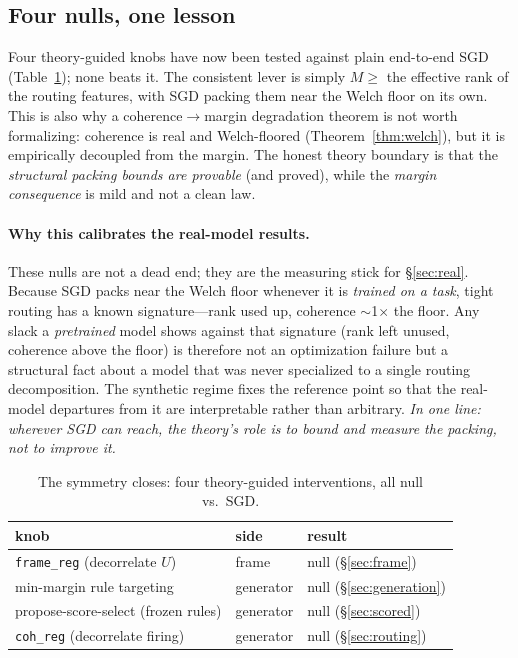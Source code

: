 \documentclass[sigconf,nonacm]{acmart}
\theoremstyle{definition}
\begin{document}
\subsection{Four nulls, one lesson}
\label{sec:nulls}
Four theory-guided knobs have now been tested against plain end-to-end SGD
(Table~\ref{tab:nulls}); none beats it. The consistent lever is simply
$M\ge$ the effective rank of the routing features, with SGD packing them near the
Welch floor on its own. This is also why a coherence$\to$margin degradation theorem
is not worth formalizing: coherence is real and Welch-floored (Theorem~\ref{thm:welch}),
but it is empirically decoupled from the margin. The honest theory boundary is that
the \emph{structural packing bounds are provable} (and proved), while the
\emph{margin consequence} is mild and not a clean law.

\paragraph{Why this calibrates the real-model results.}
These nulls are not a dead end; they are the measuring stick for
\S\ref{sec:real}. Because SGD packs near the Welch floor whenever it is \emph{trained
on a task}, tight routing has a known signature---rank used up, coherence
$\sim$1$\times$ the floor. Any slack a \emph{pretrained} model shows against that
signature (rank left unused, coherence above the floor) is therefore not an
optimization failure but a structural fact about a model that was never specialized
to a single routing decomposition. The synthetic regime fixes the reference point so
that the real-model departures from it are interpretable rather than arbitrary.
\emph{In one line: wherever SGD can reach, the theory's role is to bound and measure
the packing, not to improve it.}

\begin{table}[t]
\caption{The symmetry closes: four theory-guided interventions, all null vs.\ SGD.}
\label{tab:nulls}
\small
\begin{tabular}{lll}
\toprule
knob & side & result \\
\midrule
\texttt{frame\_reg} (decorrelate $U$)         & frame     & null (\S\ref{sec:frame}) \\
min-margin rule targeting                      & generator & null (\S\ref{sec:generation}) \\
propose-score-select (frozen rules)            & generator & null (\S\ref{sec:scored}) \\
\texttt{coh\_reg} (decorrelate firing)         & generator & null (\S\ref{sec:routing}) \\
\bottomrule
\end{tabular}
\end{table}
\end{document}
